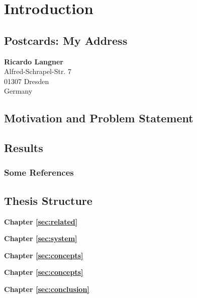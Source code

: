 %
\chapter{Introduction}
\label{sec:intro}


\Blindtext[2][2]

\section{Postcards: My Address}
\label{sec:intro:address}

\textbf{Ricardo Langner} \\
Alfred-Schrapel-Str. 7 \\
01307 Dresden \\
Germany


\section{Motivation and Problem Statement}
\label{sec:intro:motivation}

\Blindtext[3][1] \cite{Jurgens:2000,Jurgens:1995,Miede:2011,Kohm:2011,Apple:keynote:2010,Apple:numbers:2010,Apple:pages:2010}

\section{Results}
\label{sec:intro:results}

\Blindtext[1][2]

\subsection{Some References}
\label{sec:intro:results:refs}
\cite{WEB:GNU:GPL:2010,WEB:Miede:2011}

\section{Thesis Structure}
\label{sec:intro:structure}

\textbf{Chapter \ref{sec:related}} \\[0.2em]
\blindtext

\textbf{Chapter \ref{sec:system}} \\[0.2em]
\blindtext

\textbf{Chapter \ref{sec:concepts}} \\[0.2em]
\blindtext

\textbf{Chapter \ref{sec:concepts}} \\[0.2em]
\blindtext

\textbf{Chapter \ref{sec:conclusion}} \\[0.2em]
\blindtext
